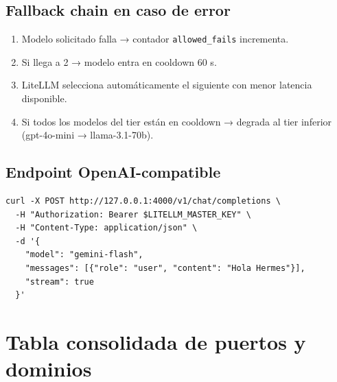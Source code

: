 \documentclass[11pt,a4paper]{article}
\begin{document}
\subsection{Fallback chain en caso de error}

\begin{enumerate}[leftmargin=*,itemsep=1pt]
\item Modelo solicitado falla → contador \texttt{allowed\_fails} incrementa.
\item Si llega a 2 → modelo entra en cooldown 60 s.
\item LiteLLM selecciona automáticamente el siguiente con menor latencia disponible.
\item Si todos los modelos del tier están en cooldown → degrada al tier inferior (gpt-4o-mini → llama-3.1-70b).
\end{enumerate}

\subsection{Endpoint OpenAI-compatible}

\begin{lstlisting}[language=bashx]
curl -X POST http://127.0.0.1:4000/v1/chat/completions \
  -H "Authorization: Bearer $LITELLM_MASTER_KEY" \
  -H "Content-Type: application/json" \
  -d '{
    "model": "gemini-flash",
    "messages": [{"role": "user", "content": "Hola Hermes"}],
    "stream": true
  }'
\end{lstlisting}

\newpage

\section{Tabla consolidada de puertos y dominios}
\end{document}
